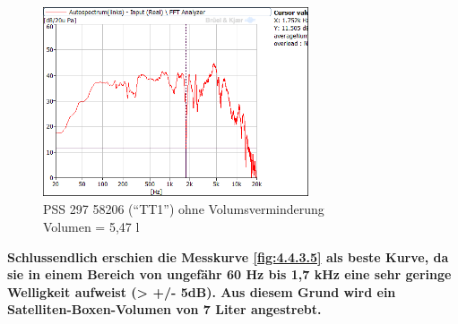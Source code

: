 \begin{figure} [H]
	\centering
	\includegraphics[width=0.7\textwidth]{img/Optimierung/TT/TT1_Styro_5-47l.png}
	\caption{PSS 297 58206 (\enquote{TT1}) ohne Volumsverminderung \\Volumen = 5,47 l}
	\label{fig:4.4.3.7}
\end{figure}

\textbf{Schlussendlich erschien die Messkurve \ref{fig:4.4.3.5} als beste Kurve, da sie in einem Bereich von ungefähr 60 Hz bis 1,7 kHz eine sehr geringe Welligkeit aufweist (> +/- 5dB).
Aus diesem Grund wird ein Satelliten-Boxen-Volumen von 7 Liter angestrebt.}


